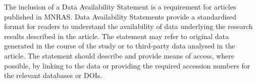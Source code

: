 \documentclass[fleqn,usenatbib]{mnras}
\begin{document}
The inclusion of a Data Availability Statement is a requirement for articles published in MNRAS. Data Availability Statements provide a standardised format for readers to understand the availability of data underlying the research results described in the article. The statement may refer to original data generated in the course of the study or to third-party data analysed in the article. The statement should describe and provide means of access, where possible, by linking to the data or providing the required accession numbers for the relevant databases or DOIs.








\appendix


\bsp	%
\label{lastpage}
\end{document}
